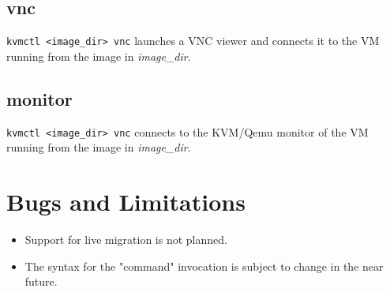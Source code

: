 \documentclass[11pt]{article}
\begin{document}
\subsection{vnc}

\texttt{kvmctl <image_dir> vnc} launches a VNC viewer and connects it to the VM running from the image in \emph{image_dir}.

\subsection{monitor}

\texttt{kvmctl <image_dir> vnc} connects to the KVM/Qemu monitor of the VM running from the image in \emph{image_dir}.

\section{Bugs and Limitations}

\begin{itemize}
\item Support for live migration is not planned.
\item The syntax for the "command" invocation is subject to change in the near future.
\end{itemize}
\end{document}
